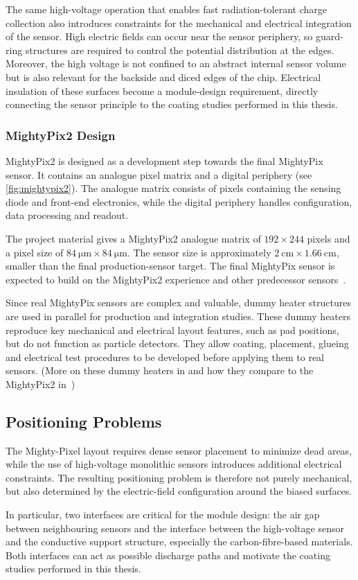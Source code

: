 The same high-voltage operation that enables fast radiation-tolerant charge collection also introduces constraints for the mechanical and electrical integration of the sensor. High electric fields can occur near the sensor periphery, so guard-ring structures are required to control the potential distribution at the edges. Moreover, the high voltage is not confined to an abstract internal sensor volume but is also relevant for the backside and diced edges of the chip. Electrical insulation of these surfaces become a module-design requirement, directly connecting the sensor principle to the coating studies performed in this thesis.
%
\subsubsection{MightyPix2 Design}
MightyPix2 is designed as a development step towards the final MightyPix sensor. It contains an analogue pixel matrix and a digital periphery (see \cref{fig:mightypix2}). The analogue matrix consists of pixels containing the sensing diode and front-end electronics, while the digital periphery handles configuration, data processing and readout.\par
The project material gives a MightyPix2 analogue matrix of $192\times244$ pixels and a pixel size of $\SI{84}{\micro\meter}\times\SI{84}{\micro\meter}$. The sensor size is approximately $\SI{2}{\centi\meter}\times\SI{1.66}{\centi\meter}$, smaller than the final production-sensor target. The final MightyPix sensor is expected to build on the MightyPix2 experience and other predecessor sensors~\cite{Schmitz2026-je, Peric, CERN-LHCC-2021-012}.\par
Since real MightyPix sensors are complex and valuable, dummy heater structures are used in parallel for production and integration studies. These dummy heaters reproduce key mechanical and electrical layout features, such as pad positions, but do not function as particle detectors. They allow coating, placement, glueing and electrical test procedures to be developed before applying them to real sensors. (More on these dummy heaters in and how they compare to the MightyPix2 in~)

%
\subsection{Positioning Problems}\label{sec:pos_prob}
The Mighty-Pixel layout requires dense sensor placement to minimize dead areas, while the use of high-voltage monolithic sensors introduces additional electrical constraints. The resulting positioning problem is therefore not purely mechanical, but also determined by the electric-field configuration around the biased surfaces.\par
In particular, two interfaces are critical for the module design: the air gap between neighbouring sensors and the interface between the high-voltage sensor and the conductive support structure, especially the carbon-fibre-based materials. Both interfaces can act as possible discharge paths and motivate the coating studies performed in this thesis.
%
